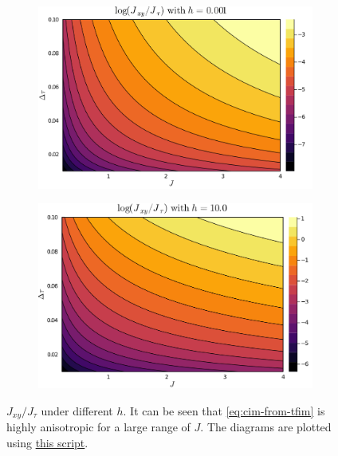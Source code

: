 \documentclass[hyperref, a4paper]{article}
\begin{document}
\begin{figure}
    \centering
    \begin{subfigure}{0.48\textwidth}
        \includegraphics[width=\textwidth]{../analytical/jxy-jtau-ratio/ratio-h-0.001-dtau-0.02.PNG}
    \end{subfigure}
    \begin{subfigure}{0.48\textwidth}
        \includegraphics[width=\textwidth]{../analytical/jxy-jtau-ratio/ratio-h-10-dtau-0.02.PNG}
    \end{subfigure}
    \caption{$J_{xy} / J_\tau$ under different $h$. 
    It can be seen that \eqref{eq:cim-from-tfim} is highly anisotropic for a large range of $J$. The diagrams are plotted using \href{../analytical/jxy-jtau-ratio/2d-tfim-to-3d-cim-v2.jl}{this script}. }
    \label{fig:jxy-jtau-ratio}
\end{figure}
\end{document}
